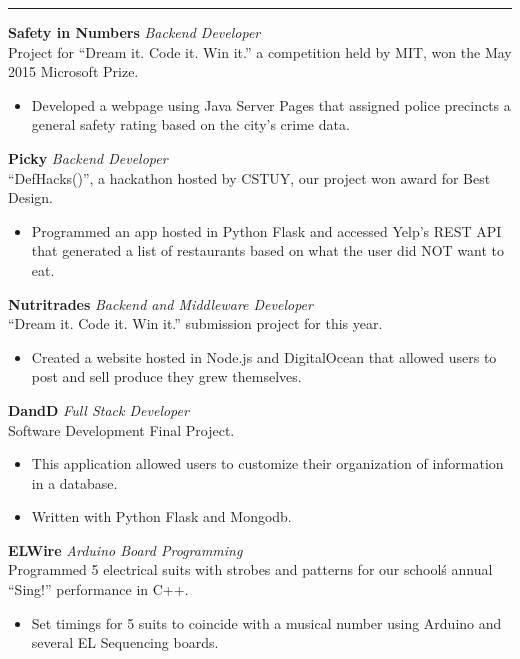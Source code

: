 \documentclass[14, .75in]{article}
\begin{document}
  \vspace{0.1cm} \hrule \vspace{0.3cm}
  \noindent\textbf{Safety in Numbers}\textit{ Backend Developer}\\
  Project for ``Dream it. Code it. Win it.'' a competition held by MIT, won the May 2015 Microsoft Prize.
  \begin{itemize}[label={--},noitemsep, topsep=0pt]
    \item Developed a webpage using Java Server Pages that assigned police precincts a general safety rating based on the city's crime data.
  \end{itemize}
  \textbf{Picky}\textit{ Backend Developer}\\ ``DefHacks()'', a hackathon hosted by CSTUY, our project won award for Best Design.
  \begin{itemize}[label={--},noitemsep, topsep=0pt]
    \item Programmed an app hosted in Python Flask and accessed Yelp's REST API that generated a list of restaurants based on what the user did NOT want to eat.
  \end{itemize}
  \textbf{Nutritrades}\textit{ Backend and Middleware Developer}\\
  ``Dream it. Code it. Win it.'' submission project for this year.
  \begin{itemize}[label={--},noitemsep, topsep=0pt]
    \item Created a website hosted in Node.js and DigitalOcean that allowed users to post and sell produce they grew themselves.
  \end{itemize}
  \textbf{DandD}\textit{ Full Stack Developer}\\
  Software Development Final Project.
  \begin{itemize}[label={--},noitemsep, topsep=0pt]
    \item This application allowed users to customize their organization of information in a database.
    \item Written with Python Flask and Mongodb.
  \end{itemize}
  \textbf{ELWire}\textit{ Arduino Board Programming}\\
  Programmed 5 electrical suits with strobes and patterns for our school\'s annual ``Sing!'' performance in C++.
  \begin{itemize}[label={--},noitemsep, topsep=0pt]
    \item Set timings for 5 suits to coincide with a musical number using Arduino and several EL Sequencing boards.
  \end{itemize}
\end{document}
